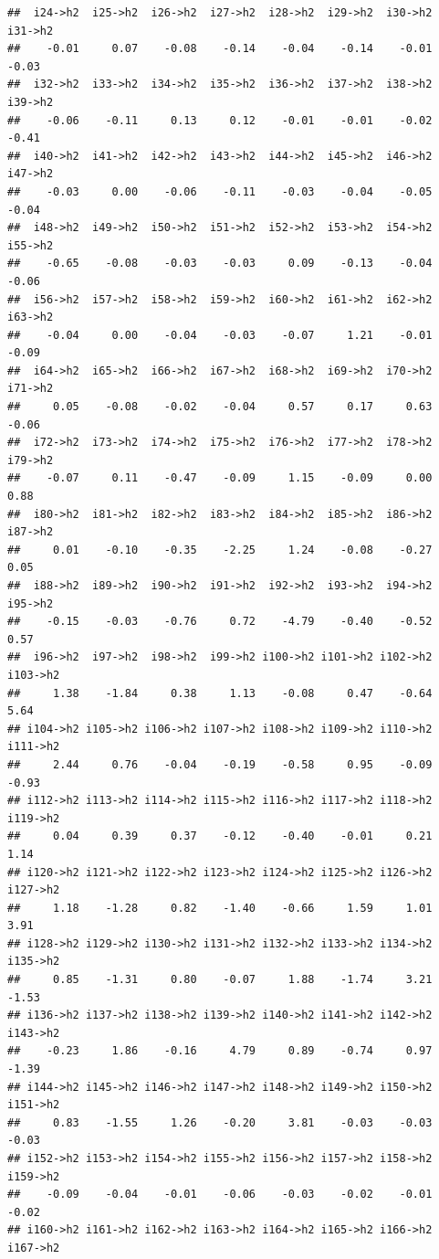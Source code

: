 \documentclass[
]{article}
\begin{document}
\begin{verbatim}
##  i24->h2  i25->h2  i26->h2  i27->h2  i28->h2  i29->h2  i30->h2  i31->h2 
##    -0.01     0.07    -0.08    -0.14    -0.04    -0.14    -0.01    -0.03 
##  i32->h2  i33->h2  i34->h2  i35->h2  i36->h2  i37->h2  i38->h2  i39->h2 
##    -0.06    -0.11     0.13     0.12    -0.01    -0.01    -0.02    -0.41 
##  i40->h2  i41->h2  i42->h2  i43->h2  i44->h2  i45->h2  i46->h2  i47->h2 
##    -0.03     0.00    -0.06    -0.11    -0.03    -0.04    -0.05    -0.04 
##  i48->h2  i49->h2  i50->h2  i51->h2  i52->h2  i53->h2  i54->h2  i55->h2 
##    -0.65    -0.08    -0.03    -0.03     0.09    -0.13    -0.04    -0.06 
##  i56->h2  i57->h2  i58->h2  i59->h2  i60->h2  i61->h2  i62->h2  i63->h2 
##    -0.04     0.00    -0.04    -0.03    -0.07     1.21    -0.01    -0.09 
##  i64->h2  i65->h2  i66->h2  i67->h2  i68->h2  i69->h2  i70->h2  i71->h2 
##     0.05    -0.08    -0.02    -0.04     0.57     0.17     0.63    -0.06 
##  i72->h2  i73->h2  i74->h2  i75->h2  i76->h2  i77->h2  i78->h2  i79->h2 
##    -0.07     0.11    -0.47    -0.09     1.15    -0.09     0.00     0.88 
##  i80->h2  i81->h2  i82->h2  i83->h2  i84->h2  i85->h2  i86->h2  i87->h2 
##     0.01    -0.10    -0.35    -2.25     1.24    -0.08    -0.27     0.05 
##  i88->h2  i89->h2  i90->h2  i91->h2  i92->h2  i93->h2  i94->h2  i95->h2 
##    -0.15    -0.03    -0.76     0.72    -4.79    -0.40    -0.52     0.57 
##  i96->h2  i97->h2  i98->h2  i99->h2 i100->h2 i101->h2 i102->h2 i103->h2 
##     1.38    -1.84     0.38     1.13    -0.08     0.47    -0.64     5.64 
## i104->h2 i105->h2 i106->h2 i107->h2 i108->h2 i109->h2 i110->h2 i111->h2 
##     2.44     0.76    -0.04    -0.19    -0.58     0.95    -0.09    -0.93 
## i112->h2 i113->h2 i114->h2 i115->h2 i116->h2 i117->h2 i118->h2 i119->h2 
##     0.04     0.39     0.37    -0.12    -0.40    -0.01     0.21     1.14 
## i120->h2 i121->h2 i122->h2 i123->h2 i124->h2 i125->h2 i126->h2 i127->h2 
##     1.18    -1.28     0.82    -1.40    -0.66     1.59     1.01     3.91 
## i128->h2 i129->h2 i130->h2 i131->h2 i132->h2 i133->h2 i134->h2 i135->h2 
##     0.85    -1.31     0.80    -0.07     1.88    -1.74     3.21    -1.53 
## i136->h2 i137->h2 i138->h2 i139->h2 i140->h2 i141->h2 i142->h2 i143->h2 
##    -0.23     1.86    -0.16     4.79     0.89    -0.74     0.97    -1.39 
## i144->h2 i145->h2 i146->h2 i147->h2 i148->h2 i149->h2 i150->h2 i151->h2 
##     0.83    -1.55     1.26    -0.20     3.81    -0.03    -0.03    -0.03 
## i152->h2 i153->h2 i154->h2 i155->h2 i156->h2 i157->h2 i158->h2 i159->h2 
##    -0.09    -0.04    -0.01    -0.06    -0.03    -0.02    -0.01    -0.02 
## i160->h2 i161->h2 i162->h2 i163->h2 i164->h2 i165->h2 i166->h2 i167->h2 

\end{verbatim}
\end{document}
